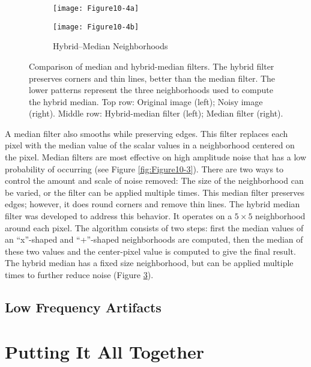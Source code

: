 \begin{figure}[htb]
	\begin{subfigure}[h]{0.96\linewidth}
		\texttt{[image: Figure10-4a]}
		\captionsetup{justification=centering}
		\caption*{}
		\label{fig:Figure10-4a}
	\end{subfigure}
	\hfill
	\begin{subfigure}[h]{0.32\linewidth}
		\texttt{[image: Figure10-4b]}
		\captionsetup{justification=centering}
		\caption*{Hybrid--Median Neighborhoods}
		\label{fig:Figure10-4b}
	\end{subfigure}
	\caption{Comparison of median and hybrid-median filters. The hybrid filter preserves corners and thin lines, better than the median filter. The lower patterns represent the three neighborhoods used to compute the hybrid median. Top row: Original image (left); Noisy image (right). Middle row: Hybrid-median filter (left); Median filter (right).}\label{fig:Figure10-4}
\end{figure}

A median filter also smooths while preserving edges. This filter replaces each pixel with the median value of the scalar values in a neighborhood centered on the pixel. Median filters are most effective on high amplitude noise that has a low probability of occurring (see Figure \ref{fig:Figure10-3}). There are two ways to control the amount and scale of noise removed: The size of the neighborhood can be varied, or the filter can be applied multiple times. This median filter preserves edges; however, it does round corners and remove thin lines. The hybrid median filter was developed to address this behavior. It operates on a $5 \times 5$ neighborhood around each pixel. The algorithm consists of two steps: first the median values of an ``x''-shaped and ``+''-shaped neighborhoods are computed, then the median of these two values and the center-pixel value is computed to give the final result. The hybrid median has a fixed size neighborhood, but can be applied multiple times to further reduce noise (Figure \ref{fig:Figure10-4}).

\subsection{Low Frequency Artifacts}

\section{Putting It All Together}
\label{sec:chap10.putting_it_all_together}

